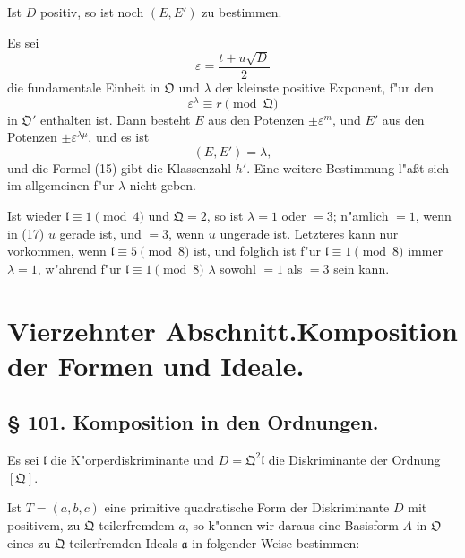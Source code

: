 \documentclass[12pt,a4paper]{article}
\theoremstyle{plain}
\begin{document}
Ist $D$ positiv, so ist noch $(E, E')$ zu bestimmen.

Es sei
\[
\varepsilon = \frac{t + u\sqrt{D}}{2}
\]
die fundamentale Einheit in $\mathfrak{O}$ und $\lambda$ der kleinste positive Exponent, f"ur den
\begin{equation}
\varepsilon^\lambda \equiv r \pmod{\mathfrak{Q}}
\tag{17}
\end{equation}
in $\mathfrak{O}'$ enthalten ist. Dann besteht $E$ aus den Potenzen $\pm\varepsilon^m$, und $E'$ aus den Potenzen $\pm\varepsilon^{\lambda\mu}$, und es ist
\[
(E, E') = \lambda,
\]
und die Formel (15) gibt die Klassenzahl $h'$. Eine weitere Bestimmung l"a\ss t sich im allgemeinen f"ur $\lambda$ nicht geben.

Ist wieder $\mathfrak{l} \equiv 1 \pmod{4}$ und $\mathfrak{Q} = 2$, so ist $\lambda = 1$ oder $= 3$; n"amlich $= 1$, wenn in (17) $u$ gerade ist, und $= 3$, wenn $u$ ungerade ist. Letzteres kann nur vorkommen, wenn $\mathfrak{l} \equiv 5 \pmod{8}$ ist, und folglich ist f"ur $\mathfrak{l} \equiv 1 \pmod{8}$ immer $\lambda = 1$, w"ahrend f"ur $\mathfrak{l} \equiv 1 \pmod{8}$ $\lambda$ sowohl $= 1$ als $= 3$ sein kann.

\newpage
\section*{Vierzehnter Abschnitt.\quad Komposition der Formen und Ideale.}

\subsection*{\S{} 101. Komposition in den Ordnungen.}

Es sei $\mathfrak{l}$ die K"orperdiskriminante und $D = \mathfrak{Q}^2\mathfrak{l}$ die Diskriminante der Ordnung $[\mathfrak{Q}]$.

Ist $T = (a, b, c)$ eine primitive quadratische Form der Diskriminante $D$ mit positivem, zu $\mathfrak{Q}$ teilerfremdem $a$, so k"onnen wir daraus eine Basisform $A$ in $\mathfrak{O}$ eines zu $\mathfrak{Q}$ teilerfremden Ideals $\mathfrak{a}$ in folgender Weise bestimmen:
\end{document}
